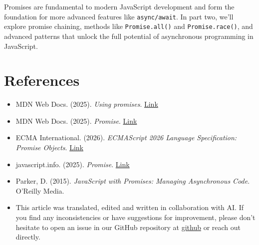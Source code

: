 \documentclass[12pt,letterpaper]{article}
\begin{document}
Promises are fundamental to modern JavaScript development and form the foundation for more advanced features like \texttt{\textcolor{accentColor}{async/await}}. In part two, we'll explore promise chaining, methods like \texttt{\textcolor{accentColor}{Promise.all()}} and \texttt{\textcolor{accentColor}{Promise.race()}}, and advanced patterns that unlock the full potential of asynchronous programming in JavaScript.

\section{References}

\begin{itemize}
    \item MDN Web Docs. (2025). \textit{Using promises}. \href{https://developer.mozilla.org/en-US/docs/Web/JavaScript/Guide/Using_promises}{Link}
    
    \item MDN Web Docs. (2025). \textit{Promise}. \href{https://developer.mozilla.org/en-US/docs/Web/JavaScript/Reference/Global_Objects/Promise}{Link}
    
    \item ECMA International. (2026). \textit{ECMAScript 2026 Language Specification: Promise Objects}. \href{https://tc39.es/ecma262/multipage/control-abstraction-objects.html#sec-promise-objects}{Link}
    
    \item javascript.info. (2025). \textit{Promise}. \href{https://javascript.info/promise-basics}{Link}
    
    \item Parker, D. (2015). \textit{JavaScript with Promises: Managing Asynchronous Code}. O'Reilly Media.

    \item This article was translated, edited and written in collaboration with AI. If you find any inconsistencies or have suggestions for improvement, please don't hesitate to open an issue in our GitHub repository at \href{https://github.com/asanchezyali/social-media-posts}{github} or reach out directly.
\end{itemize}
\end{document}
